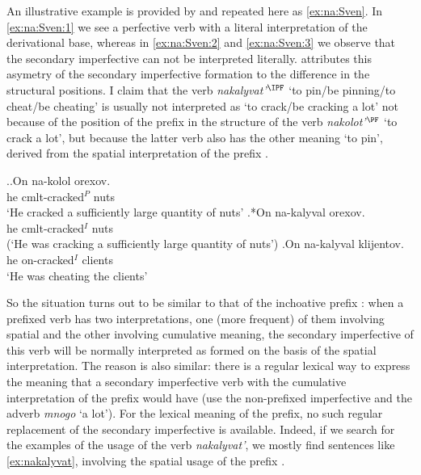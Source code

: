 An illustrative example is provided by \citet[233]{Svenonius:04b} and repeated here as \ref{ex:na:Sven}. In \ref{ex:na:Sven:1} we see a perfective verb with a literal interpretation of the derivational base, whereas in \ref{ex:na:Sven:2} and \ref{ex:na:Sven:3} we observe that the secondary imperfective can not be interpreted literally. \citet[233]{Svenonius:04b} attributes this asymetry of the secondary imperfective formation to the difference in the structural positions. I claim that the verb \textit{nakalyvat'}$^{\IPF}$ `to pin/be pinning/to cheat/be cheating' is usually not interpreted as `to crack/be cracking a lot' not because of the position of the prefix in the structure of the verb \textit{nakolot'}$^{\PF}$ `to crack a lot', but because the latter verb also has the other meaning `to pin', derived from the spatial interpretation of the prefix . 

\ex.\label{ex:na:Sven}\ag.\label{ex:na:Sven:1}On na-kolol orexov.\\
he cmlt-cracked$^P$ nuts\\
\trans `He cracked a sufficiently large quantity of nuts'
\bg.\label{ex:na:Sven:2}*On na-kalyval orexov.\\
he cmlt-cracked$^I$ nuts\\
\vspace{0.5em}
(`He was cracking a sufficiently large quantity of nuts')
\bg.\label{ex:na:Sven:3}On na-kalyval klijentov.\\
he on-cracked$^I$ clients\\
\trans `He was cheating the clients'\\

So the situation turns out to be similar to that of the inchoative prefix : when a prefixed verb has two interpretations, one (more frequent) of them involving spatial and the other involving cumulative meaning, the secondary imperfective of this verb will be normally interpreted as formed on the basis of the spatial interpretation. The reason is also similar: there is a regular lexical way to express the meaning that a secondary imperfective verb with the cumulative interpretation of the prefix  would have (use the non-prefixed imperfective and the adverb \textit{mnogo} `a lot'). For the lexical meaning of the prefix, no such regular replacement of the secondary imperfective is available. Indeed, if we search for the examples of the usage of the verb \textit{nakalyvat'}, we mostly find sentences like \ref{ex:nakalyvat}, involving the spatial usage of the prefix . 

